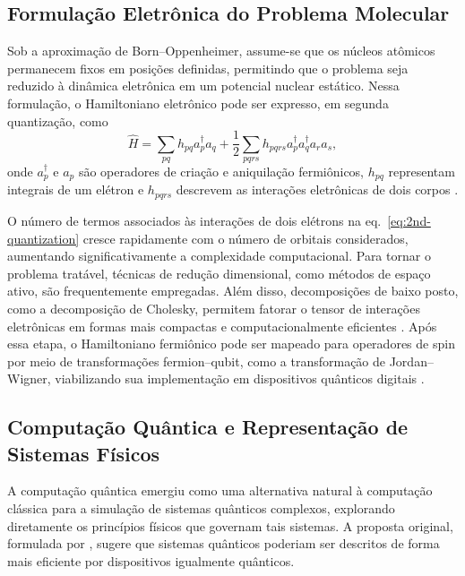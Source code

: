 \subsection{Formulação Eletrônica do Problema Molecular}

Sob a aproximação de Born–Oppenheimer, assume-se que os núcleos
atômicos permanecem fixos em posições definidas,
permitindo que o problema seja reduzido à dinâmica eletrônica
em um potencial nuclear estático.
Nessa formulação, o Hamiltoniano eletrônico pode ser expresso,
em segunda quantização, como
\begin{equation}
\label{eq:2nd-quantization}
\hat{H} =
\sum_{pq} h_{pq} a_p^\dagger a_q
+
\frac{1}{2}
\sum_{pqrs} h_{pqrs}
a_p^\dagger a_q^\dagger a_r a_s,
\end{equation}
onde $a_p^\dagger$ e $a_p$ são operadores de criação e aniquilação
fermiônicos, $h_{pq}$ representam integrais de um elétron
e $h_{pqrs}$ descrevem as interações eletrônicas de dois corpos \cite{aspuru-guzikSimulatedQuantumComputation2005,whitfieldSimulationElectronicStructure2011, cao2019quantum}.

O número de termos associados às interações de dois elétrons na eq.~\eqref{eq:2nd-quantization} cresce
rapidamente com o número de orbitais considerados,
aumentando significativamente a complexidade computacional.
Para tornar o problema tratável, técnicas de redução dimensional,
como métodos de espaço ativo,
são frequentemente empregadas.
Além disso, decomposições de baixo posto,
como a decomposição de Cholesky,
permitem fatorar o tensor de interações eletrônicas em formas
mais compactas e computacionalmente eficientes \cite{motta2018lowrank, cohn2021quantum, pedersenVersatilityCholeskyDecomposition2024}. Após essa etapa, o Hamiltoniano fermiônico pode ser mapeado
para operadores de spin por meio de transformações
fermion–qubit, como a transformação de Jordan–Wigner,
viabilizando sua implementação em dispositivos quânticos digitais \cite{cao2019quantum}.

\subsection{Computação Quântica e Representação de Sistemas Físicos}

A computação quântica emergiu como uma alternativa natural à computação clássica 
para a simulação de sistemas quânticos complexos,
explorando diretamente os princípios físicos que governam tais sistemas.
A proposta original, formulada por \textcite{feynman1982simulating},
sugere que sistemas quânticos poderiam ser descritos
de forma mais eficiente por dispositivos igualmente quânticos.

